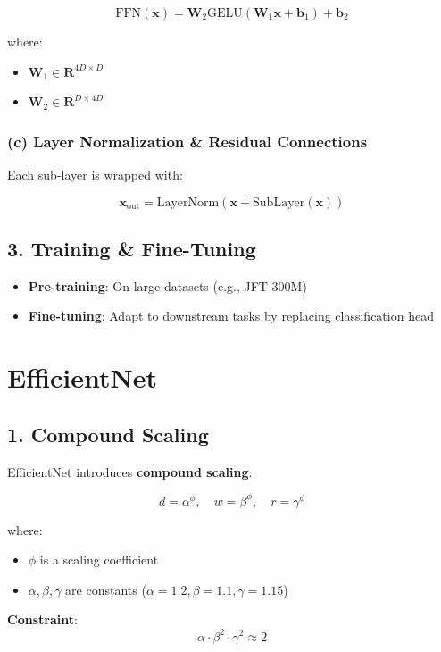 \documentclass[12pt]{article}
\begin{document}
\begin{appendices}
\[
\text{FFN}(\mathbf{x}) = \mathbf{W}_2 \text{GELU}(\mathbf{W}_1 \mathbf{x} + \mathbf{b}_1) + \mathbf{b}_2
\]

where:
\begin{itemize}
    \item $\mathbf{W}_1 \in \mathbf{R}^{4D \times D}$
    \item $\mathbf{W}_2 \in \mathbf{R}^{D \times 4D}$
\end{itemize}

\subsubsection*{(c) Layer Normalization \& Residual Connections}
Each sub-layer is wrapped with:

\[
\mathbf{x}_{\text{out}} = \text{LayerNorm}(\mathbf{x} + \text{SubLayer}(\mathbf{x}))
\]

\subsection*{3. Training \& Fine-Tuning}
\begin{itemize}
    \item \textbf{Pre-training}: On large datasets (e.g., JFT-300M)
    \item \textbf{Fine-tuning}: Adapt to downstream tasks by replacing classification head
\end{itemize}

\section{EfficientNet}
\label{app:efficientnet}
\subsection*{1. Compound Scaling}
EfficientNet introduces \textbf{compound scaling}:

\[
d = \alpha^\phi, \quad w = \beta^\phi, \quad r = \gamma^\phi
\]

where:
\begin{itemize}
    \item $\phi$ is a scaling coefficient
    \item $\alpha, \beta, \gamma$ are constants ($\alpha = 1.2, \beta = 1.1, \gamma = 1.15$)
\end{itemize}

\textbf{Constraint}:
\[
\alpha \cdot \beta^2 \cdot \gamma^2 \approx 2
\]


\end{appendices}
\end{document}
